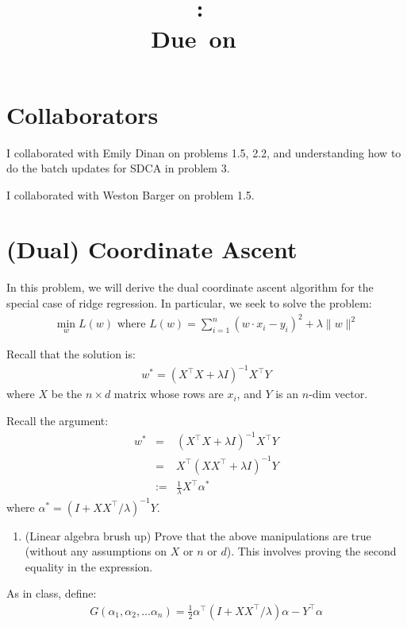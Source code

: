 \documentclass{article}
\title{
    \vspace{2in}
    \textmd{\textbf{\hmwkClass:\ \hmwkTitle}}\\
    \normalsize\vspace{0.1in}\small{Due\ on\ \hmwkDueDate\ }\\
    \vspace{3in}
}
\author{\textbf{\hmwkAuthorName}}
\date{}
\begin{document}
\maketitle

\pagebreak

\section*{Collaborators}
I collaborated with Emily Dinan on problems 1.5, 2.2, and understanding how to do the batch updates for SDCA in problem 3.

I collaborated with Weston Barger on problem 1.5.



\section{(Dual) Coordinate Ascent}


In this problem, we will derive the dual coordinate ascent algorithm for the special case of ridge regression. In particular, we seek to solve the problem:
\begin{align}
	\min_w L(w) \textrm{ where } L(w)= \sum_{i=1}^n (w\cdot x_i - y_i)^2 + \lambda \|w\|^2
\end{align}

Recall that the solution is:
\begin{align}
	w^* = (X^\top X+\lambda I)^{-1} X^\top Y
\end{align}
where $X$ be the $n\times d$ matrix whose rows are $x_i$, and $Y$ is an $n$-dim vector.

Recall the argument:
\begin{eqnarray*}
	w^* & = &  (X^\top X+\lambda I)^{-1} X^\top Y\\
	 & = &  X^\top (X X^\top+\lambda I)^{-1} Y\\
	 & := &  \frac{1}{\lambda} X^\top \alpha^*
\end{eqnarray*}
where $\alpha^* = (I+XX^\top/ \lambda )^{-1} Y$.

\begin{enumerate}
	\item (Linear algebra brush up) Prove that the above manipulations are true (without any assumptions on $X$ or $n$ or $d$). This involves proving the second equality in the expression.
\end{enumerate}

As in class, define:
\begin{align}
	G(\alpha_1, \alpha_2, \ldots \alpha_n) = \frac{1}{2} \alpha^\top
	(I+XX^\top/ \lambda ) \alpha - Y^\top \alpha
\end{align}
\end{document}
